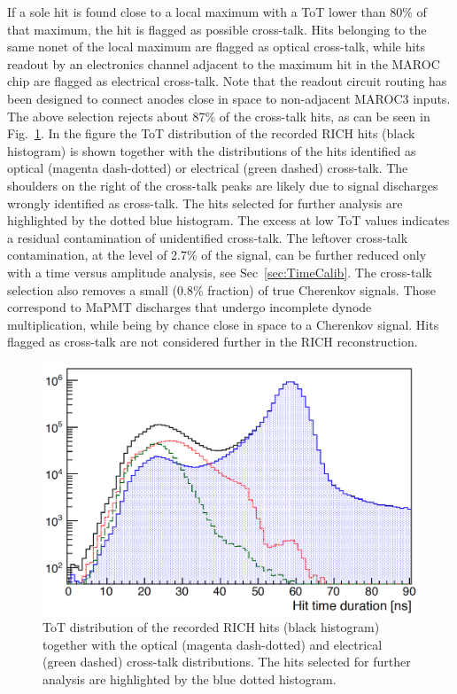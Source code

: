 \documentclass[5p,times,twocolumn]{elsarticle}
\begin{document}
If a sole hit is found close to a local maximum with a ToT lower than 80\% of that maximum, the hit is flagged as
possible cross-talk. Hits belonging to the same nonet of the local maximum are flagged as optical cross-talk, while hits
readout by an electronics channel adjacent to the maximum hit in the MAROC chip are flagged as electrical
cross-talk. Note that the readout circuit routing has been designed to connect anodes close in space to non-adjacent
MAROC3 inputs. The above selection rejects about 87\% of the cross-talk hits, as can be seen in Fig.~\ref{Fig:Xtalk}.
In the figure the ToT distribution of the recorded RICH hits (black histogram) is shown together with the
distributions of the hits identified as optical (magenta dash-dotted) or electrical (green dashed) cross-talk. The
shoulders on the right of the cross-talk peaks are likely due to signal discharges wrongly identified as cross-talk.
The hits selected for further analysis are highlighted by the dotted blue histogram. The excess at low ToT values
indicates a residual contamination of unidentified cross-talk. The leftover cross-talk contamination, at the level of
2.7\% of the signal, can be further reduced only with a time versus amplitude analysis, see Sec~\ref{sec:TimeCalib}.
The cross-talk selection also removes a small (0.8\% fraction) of true Cherenkov signals. Those correspond to MaPMT
discharges that undergo incomplete dynode multiplication, while being by chance close in space to a Cherenkov signal.
Hits flagged as cross-talk are not considered further in the RICH reconstruction.

\begin{figure}[t]
\begin{center}
\includegraphics[width=1.0\columnwidth]{xtalk.png}
\end{center}
\caption{ToT distribution of the recorded RICH hits (black histogram) together with the optical (magenta dash-dotted)
  and electrical (green dashed) cross-talk distributions.  The hits selected for further analysis are highlighted by the
  blue dotted histogram. }
\label{Fig:Xtalk}
\end{figure}
\end{document}
